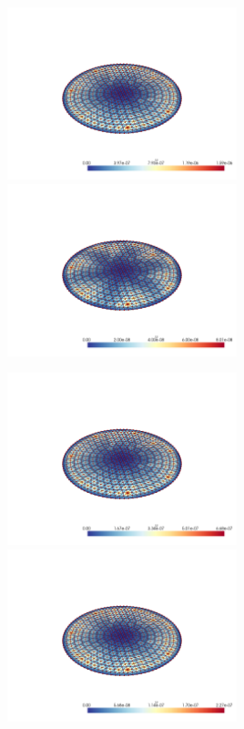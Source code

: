 \documentclass[
  11pt,
]{article}
\let\origfigure\figure
\let\endorigfigure\endfigure
\renewenvironment{figure}[1][2] {
    \expandafter\origfigure\expandafter[H]
} {
    \endorigfigure
}
\begin{document}
\begin{figure}
\caption{Finite element error in the L2 and H1 norms/seminorms, respectively for problem 1 over mesh number 2 using order 19 quadrature.}
\end{figure}

\includegraphics[width=0.5\textwidth,height=\textheight]{../img/mesh3-gauss02-b-L2.png}
\includegraphics[width=0.5\textwidth,height=\textheight]{../img/mesh3-gauss02-b-H1.png}

\begin{figure}
\caption{Finite element error in the L2 and H1 norms/seminorms, respectively for problem 1 over mesh number 3 using order 2 quadrature.}
\end{figure}

\includegraphics[width=0.5\textwidth,height=\textheight]{../img/mesh3-gauss05-b-L2.png}
\includegraphics[width=0.5\textwidth,height=\textheight]{../img/mesh3-gauss05-b-H1.png}
\end{document}
